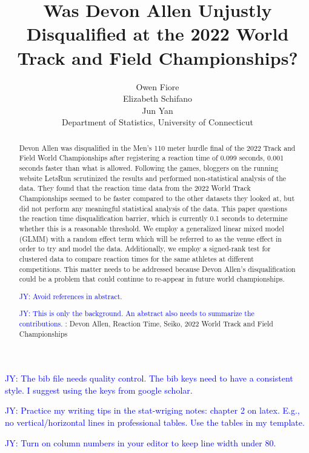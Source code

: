 \documentclass[12pt, letterpaper, titlepage]{article}
\title{Was Devon Allen Unjustly Disqualified at the 2022 World Track and Field Championships?}
\author{Owen Fiore\\
  Elizabeth Schifano\\
  Jun Yan\\[1ex]
  Department of Statistics, University of Connecticut\\
}
\date{}
\newcommand{\jy}[1]{\textcolor{blue}{JY: #1}}
\begin{document}
\maketitle

\begin{abstract}
  Devon Allen was disqualified in the Men's 110 meter hurdle final of the 2022
  Track and Field World Championships after registering a reaction time of 0.099 seconds, 0.001 
  seconds faster than what is allowed.  Following the games, bloggers on the running website 
  LetsRun scrutinized the results and performed non-statistical analysis of the data.
  They found that the reaction time data from the 2022 World Track Championships seemed to be faster 
  compared to the other datasets they looked at, but did not perform any meaningful statistical 
  analysis of the data.  This paper questions the reaction time disqualification barrier, which is
  currently 0.1 seconds to determine whether this is a reasonable threshold.
  We employ a generalized linear mixed model (GLMM) with a random effect term
  which will be referred to as the venue effect in order to try and model the
  data.  Additionally, we employ a signed-rank test for clustered data to compare
  reaction times for the same athletes at different competitions.
  This matter needs to be addressed because Devon Allen's disqualification could 
  be a problem that could continue to re-appear in future world championships.

  \jy{Avoid references in abstract.}

  
  \jy{This is only the background. An abstract also needs to summarize the contributions.}
\noindent{}:
Devon Allen, Reaction Time, Seiko, 2022 World Track and Field Championships 

\end{abstract}

\doublespace

\jy{The bib file needs quality control. The bib keys need to have a consistent
  style. I suggest using the keys from google scholar.}

\jy{Practice my writing tips in the stat-wriging notes: chapter 2 on
  latex. E.g., no vertical/horizontal lines in professional tables. Use the
  tables in my template.}

\jy{Turn on column numbers in your editor to keep line width under 80.}
\end{document}
